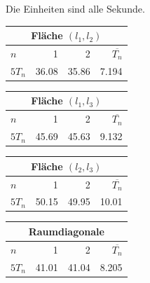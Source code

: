             Die Einheiten sind alle Sekunde.
            \vspace{-\baselineskip}
            \begin{multicols}{3}
                \begin{center}
                    \begin{tabular}{lrr|r}
                        \multicolumn{4}{c}{Fläche $(l_1, l_2)$} \\
                        \toprule
                        $n$    & 1 & 2 & $\overbar{T_n}$ \\
                        \midrule
                        $5T_n$ & \SI{36.08}{} & \SI{35.86}{} & \SI{7.194}{} \\
                        \bottomrule
                    \end{tabular}
                \end{center}
                \begin{center}
                    \begin{tabular}{lrr|r}
                        \multicolumn{4}{c}{Fläche $(l_1, l_3)$} \\
                        \toprule
                        $n$    & 1 & 2 & $\overbar{T_n}$ \\
                        \midrule
                        $5T_n$ & \SI{45.69}{} & \SI{45.63}{} & \SI{9.132}{} \\
                        \bottomrule
                    \end{tabular}
                \end{center}
                \begin{center}
                    \begin{tabular}{lrr|r}
                        \multicolumn{4}{c}{Fläche $(l_2, l_3)$} \\
                        \toprule
                        $n$    & 1 & 2 & $\overbar{T_n}$ \\
                        \midrule
                        $5T_n$ & \SI{50.15}{} & \SI{49.95}{} & \SI{10.01}{} \\
                        \bottomrule
                    \end{tabular}
                \end{center}
            \end{multicols}
            \begin{center}
                \begin{tabular}{lrr|r}
                    \multicolumn{4}{c}{Raumdiagonale} \\
                    \toprule
                    $n$    & 1 & 2 & $\overbar{T_n}$ \\
                    \midrule
                    $5T_n$ & \SI{41.01}{} & \SI{41.04}{} & \SI{8.205}{} \\
                    \bottomrule
                \end{tabular}
            \end{center}

